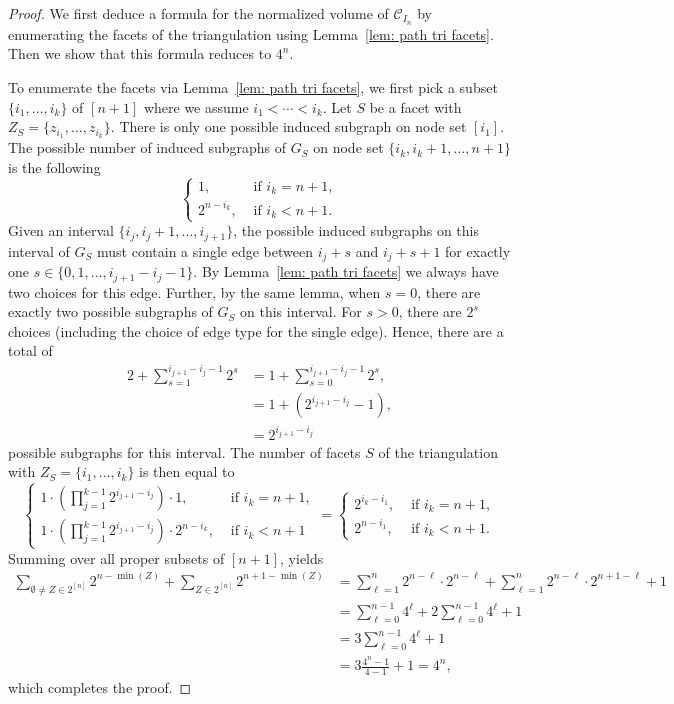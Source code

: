 \documentclass[11pt]{article}
\theoremstyle{definition}
\numberwithin{equation}{section}
\begin{document}
\begin{proof}
We first deduce a formula for the normalized volume of $\mathcal{C}_{I_{n}}$ by enumerating the facets of the triangulation using Lemma~\ref{lem: path tri facets}.  Then we show that this formula reduces to $4^n$. 

To enumerate the facets via Lemma~\ref{lem: path tri facets}, we first pick a subset $\{i_1,\ldots, i_k\}$ of $[n+1]$ where we assume $i_1 < \cdots < i_k$.  Let $S$ be a facet with $Z_S=\{z_{i_1},\ldots,z_{i_k}\}$.
There is only one possible induced subgraph on node set $[i_1]$. 
The possible number of induced subgraphs of $G_S$ on node set $\{i_k, i_k+1,\ldots, n+1\}$ is the following
\[
\begin{cases}
1,   &   \mbox{ if } i_k = n+1,\\
2^{n-i_k},   &   \mbox{ if } i_k < n+1.
\end{cases}
\]
Given an interval $\{i_j, i_j+1,\ldots, i_{j+1}\}$, the possible induced subgraphs on this interval of $G_S$ must contain a single edge between $i_j +s$ and $i_j + s + 1$ for exactly one  $s\in\{0,1,\ldots, i_{j+1} - i_j -1\}$. 
By Lemma~\ref{lem: path tri facets} we always have two choices for this edge. 
Further, by the same lemma, when $s = 0$, there are exactly two possible subgraphs of $G_S$ on this interval. 
For $s > 0$, there are $2^{s}$ choices (including the choice of edge type for the single edge). 
Hence, there are a total of
\begin{equation*}
\begin{split}
2 + \sum_{s = 1}^{i_{j+1}-i_j -1}2^s
&= 1 + \sum_{s = 0}^{i_{j+1}-i_j -1}2^s,\\
&= 1 + (2^{i_{j+1} - i_j}-1),\\
&= 2^{i_{j+1} - i_j}
\end{split}
\end{equation*}
possible subgraphs for this interval.
The number of facets $S$ of the triangulation with $Z_S = \{i_1,\ldots, i_k\}$ is then equal to 
\[
\begin{cases}
1\cdot \left(\prod_{j=1}^{k-1}2^{i_{j+1} - i_j}\right) \cdot 1,    & \mbox{ if } i_k = n+1,\\
1\cdot \left(\prod_{j=1}^{k-1}2^{i_{j+1} - i_j}\right) \cdot 2^{n-i_k}, & \mbox{ if } i_k < n+1
\end{cases}
= 
\begin{cases}
2^{i_{k} - i_1},   & \mbox{ if } i_k = n+1,\\
2^{n-i_1}, & \mbox{ if } i_k < n+1.
\end{cases}
\]
Summing over all proper subsets of $[n+1]$, yields
\begin{align*}
\sum_{\emptyset\neq Z\in 2^{[n]}}2^{n-\min(Z)}+\sum_{Z\in 2^{[n]}} 2^{n+1-\min(Z)}&=\sum_{\ell=1}^n2^{n-\ell}\cdot 2^{n-\ell}+\sum_{\ell=1}^n2^{n-\ell}\cdot 2^{n+1-\ell}+1\\
&=\sum_{\ell=0}^{n-1}4^\ell+2\sum_{\ell=0}^{n-1}4^\ell+1\\
&=3\sum_{\ell=0}^{n-1}4^\ell+1\\
&=3\frac{4^n-1}{4-1}+1=4^n,
\end{align*}
which completes the proof.
\end{proof}
\end{document}
